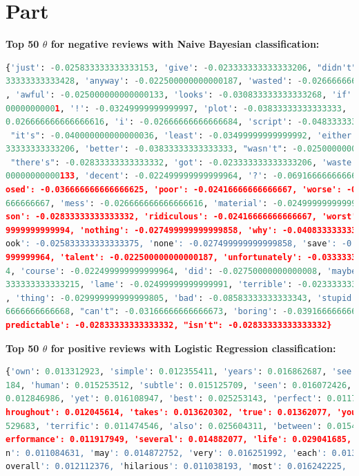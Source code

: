 \documentclass{article}
\newcommand{\enterProblemHeader}[1]{
}
\newcommand{\exitProblemHeader}[1]{
}
\newcounter{homeworkProblemCounter} %
\newcommand{\homeworkProblemName}{}
\newenvironment{homeworkProblem}[1][Part \arabic{homeworkProblemCounter}]{ %
\stepcounter{homeworkProblemCounter} %
\renewcommand{\homeworkProblemName}{#1} %
\section{\homeworkProblemName} %
\enterProblemHeader{\homeworkProblemName} %
}{
\exitProblemHeader{\homeworkProblemName} %
}
\begin{document}
\begin{homeworkProblem}
\textbf{Top 50 $\theta$ for negative reviews with Naive Bayesian classification:} 
\begin{lstlisting}[language=Python]
{'just': -0.025833333333333153, 'give': -0.023333333333333206, "didn't": -0.0233
33333333333428, 'anyway': -0.022500000000000187, 'wasted': -0.026666666666666616
, 'awful': -0.025000000000000133, 'looks': -0.030833333333333268, 'if': -0.04750
00000000001, '!': -0.03249999999999997, 'plot': -0.03833333333333333, 'guess': -
0.026666666666666616, 'i': -0.02666666666666684, 'script': -0.04833333333333334,
 "it's": -0.040000000000000036, 'least': -0.03499999999999992, 'either': -0.0233
33333333333206, 'better': -0.03833333333333333, "wasn't": -0.025000000000000133,
 "there's": -0.02833333333333332, 'got': -0.023333333333333206, 'waste': -0.0250
00000000000133, 'decent': -0.022499999999999964, '?': -0.0691666666666666, 'supp
osed': -0.036666666666666625, 'poor': -0.02416666666666667, 'worse': -0.02416666
666666667, 'mess': -0.026666666666666616, 'material': -0.02499999999999991, 'rea
son': -0.02833333333333332, 'ridiculous': -0.02416666666666667, 'worst': -0.0549
9999999999994, 'nothing': -0.027499999999999858, 'why': -0.04083333333333328, 'l
ook': -0.025833333333333375, 'none': -0.027499999999999858, 'save': -0.022499999
999999964, 'talent': -0.022500000000000187, 'unfortunately': -0.0333333333333334
4, 'course': -0.022499999999999964, 'did': -0.02750000000000008, 'maybe': -0.033
333333333333215, 'lame': -0.02499999999999991, 'terrible': -0.023333333333333428
, 'thing': -0.029999999999999805, 'bad': -0.08583333333333343, 'stupid': -0.0341
6666666666668, "can't": -0.03166666666666673, 'boring': -0.039166666666666794, '
predictable': -0.02833333333333332, "isn't": -0.02833333333333332}
\end{lstlisting} 
\textbf{Top 50 $\theta$ for positive reviews with Logistic Regression classification:} 
\begin{lstlisting}[language=Python]
{'own': 0.013312923, 'simple': 0.012355411, 'years': 0.016862687, 'see': 0.01202
184, 'human': 0.015253512, 'subtle': 0.015125709, 'seen': 0.016072426, 'still': 
0.012846986, 'yet': 0.016108947, 'best': 0.025253143, 'perfect': 0.011767382, 't
hroughout': 0.012045614, 'takes': 0.013620302, 'true': 0.01362077, 'young': 0.01
529683, 'terrific': 0.011474546, 'also': 0.025604311, 'between': 0.015466765, 'p
erformance': 0.011917949, 'several': 0.014882077, 'life': 0.029041685, 'attentio
n': 0.011084631, 'may': 0.014872752, 'very': 0.016251992, 'each': 0.013253912, '
overall': 0.012112376, 'hilarious': 0.011038193, 'most': 0.016242225, 'job': 0.0

\end{lstlisting}
\end{homeworkProblem}
\end{document}
